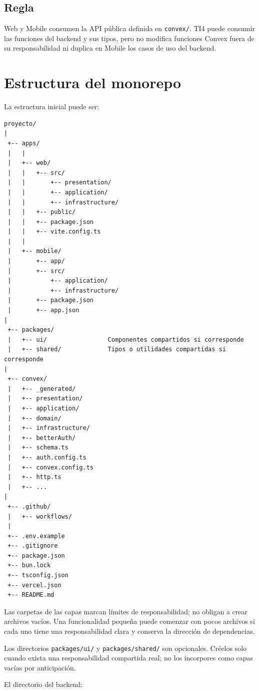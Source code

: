 \documentclass[11pt,a4paper]{article}
\begin{document}
\subsection{Regla}

Web y Mobile consumen la API pública definida en \texttt{convex/}. TI4 puede
consumir las funciones del backend y sus tipos, pero no modifica funciones
Convex fuera de su responsabilidad ni duplica en Mobile los casos de uso del
backend.

\section{Estructura del monorepo}

La estructura inicial puede ser:

\begin{lstlisting}
proyecto/
|
 +-- apps/
 |   |
 |   +-- web/
 |   |   +-- src/
 |   |       +-- presentation/
 |   |       +-- application/
 |   |       +-- infrastructure/
 |   |   +-- public/
 |   |   +-- package.json
 |   |   +-- vite.config.ts
 |   |
 |   +-- mobile/
 |       +-- app/
 |       +-- src/
 |           +-- application/
 |           +-- infrastructure/
 |       +-- package.json
 |       +-- app.json
|
 +-- packages/
 |   +-- ui/                 Componentes compartidos si corresponde
 |   +-- shared/             Tipos o utilidades compartidas si corresponde
|
 +-- convex/
 |   +-- _generated/
 |   +-- presentation/
 |   +-- application/
 |   +-- domain/
 |   +-- infrastructure/
 |   +-- betterAuth/
 |   +-- schema.ts
 |   +-- auth.config.ts
 |   +-- convex.config.ts
 |   +-- http.ts
 |   +-- ...
|
 +-- .github/
 |   +-- workflows/
 |
 +-- .env.example
 +-- .gitignore
 +-- package.json
 +-- bun.lock
 +-- tsconfig.json
 +-- vercel.json
 +-- README.md
\end{lstlisting}

Las carpetas de las capas marcan límites de responsabilidad; no obligan a crear
archivos vacíos. Una funcionalidad pequeña puede comenzar con pocos archivos si
cada uno tiene una responsabilidad clara y conserva la dirección de
dependencias.

Los directorios \texttt{packages/ui/} y \texttt{packages/shared/} son
opcionales. Créelos solo cuando exista una responsabilidad compartida real; no
los incorpores como capas vacías por anticipación.

El directorio del backend:
\end{document}
